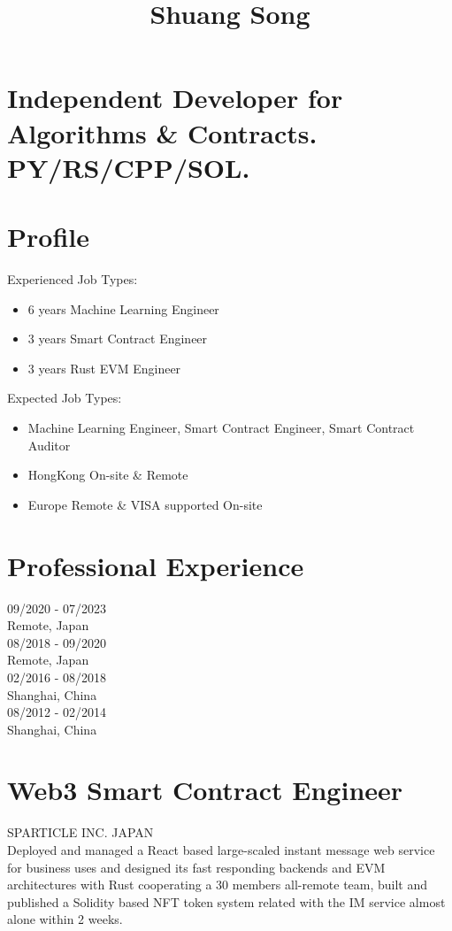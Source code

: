 \documentclass[10pt]{article}
\title{Shuang Song }
\author{}
\date{}
\begin{document}
\maketitle
\section*{Independent Developer for Algorithms \& Contracts. PY/RS/CPP/SOL.}
\section*{Profile}
Experienced Job Types:

\begin{itemize}
  \item 6 years Machine Learning Engineer
  \item 3 years Smart Contract Engineer
  \item 3 years Rust EVM Engineer
\end{itemize}

Expected Job Types:

\begin{itemize}
  \item Machine Learning Engineer, Smart Contract Engineer, Smart Contract Auditor
  \item HongKong On-site \& Remote
  \item Europe Remote \& VISA supported On-site
\end{itemize}

\section*{Professional Experience}
09/2020 - 07/2023\\
Remote, Japan\\
08/2018 - 09/2020\\
Remote, Japan\\
02/2016 - 08/2018\\
Shanghai, China\\
08/2012 - 02/2014\\
Shanghai, China

\section*{Web3 Smart Contract Engineer}
SPARTICLE INC. JAPAN\\
Deployed and managed a React based large-scaled instant message web service for business uses and designed its fast responding backends and EVM architectures with Rust cooperating a 30 members all-remote team, built and published a Solidity based NFT token system related with the IM service almost alone within 2 weeks.
\end{document}
